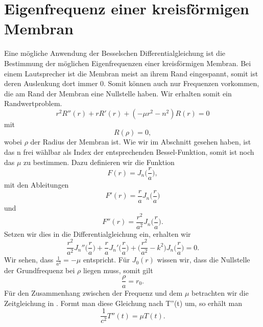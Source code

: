 \section[Eigenfrequenzen einer kreisförmigen Membram]{Eigenfrequenz einer kreisförmigen Membran}

Eine mögliche Anwendung der Besselschen Differentialgleichung ist die Bestimmung der möglichen Eigenfrequenzen einer kreisförmigen Membran. 
Bei einem Lautsprecher ist die Membran meist an ihrem Rand eingespannt, somit ist deren Auslenkung dort immer 0. Somit können auch nur Frequenzen vorkommen, die am Rand der Membran eine Nullstelle haben. Wir erhalten somit ein Randwertproblem.
\begin{equation}
r^2 R''(r) + r R'(r) + (-\mu r^2 - n^2)R(r) = 0
\label{eq:dglmitmu}
\end{equation}
mit 
\begin{equation}
R(\rho) = 0,
\end{equation}
wobei $\rho$ der Radius der Membran ist.
Wie wir im Abschnitt  gesehen haben, ist das n frei wählbar als Index der entsprechenden Bessel-Funktion, somit ist noch das $\mu$ zu bestimmen. 
Dazu definieren wir die Funktion
\begin{equation}
F(r) = J_n \biggl(\frac{r}{a} \biggr),
\end{equation}
mit den Ableitungen
\begin{equation}
F'(r) = \frac{r}{a} J_n \biggl(\frac{r}{a} \biggr)
\end{equation}
und 
\begin{equation}
F''(r) = \frac{r^2}{a^2} J_n \biggl(\frac{r}{a} \biggr).
\end{equation}
Setzen wir dies in die Differentialgleichung  ein, erhalten wir
\begin{equation}
\frac{r^2}{a^2}J_n''\biggl(\frac{r}{a} \biggr) +
\frac{r}{a}J_n'\biggl(\frac{r}{a} \biggr) +
\biggl(\frac{r^2}{a^2} - k^2\biggr)J_n\biggl(\frac{r}{a}\biggr) = 0.
\label{eq:dglmitfaktor}
\end{equation}
Wir sehen, dass $\frac{1}{a^2}=-\mu$ entspricht.
Für $J_0(r)$ wissen wir, dass die Nullstelle der Grundfrequenz bei $\rho$ liegen muss, somit gilt
\begin{equation}
\frac{\rho}{a} = r_0.
\end{equation}
Für den  Zusammenhang zwischen der Frequenz und dem $\mu$ betrachten wir die Zeitgleichung in . Formt man diese Gleichung nach T''(t) um, so erhält man 
\begin{equation}
\frac{1}{c^2} T''(t) = \mu T(t).
\end{equation} 
